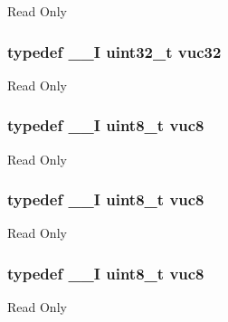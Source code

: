 Read Only \hypertarget{group___exported__types_ga2e08e321a35a55e72c5b3a507e76371f}{
\subsubsection[{vuc32}]{\setlength{\rightskip}{0pt plus 5cm}typedef {\bf \-\_\-\-\_\-\-I} uint32\-\_\-t {\bf vuc32}}}\label{group___exported__types_ga2e08e321a35a55e72c5b3a507e76371f}
Read Only \hypertarget{group___exported__types_gab0ec90ac9b2c5864755998c8d37c264a}{
\subsubsection[{vuc8}]{\setlength{\rightskip}{0pt plus 5cm}typedef {\bf \-\_\-\-\_\-\-I} uint8\-\_\-t {\bf vuc8}}}\label{group___exported__types_gab0ec90ac9b2c5864755998c8d37c264a}
Read Only \hypertarget{group___exported__types_gab0ec90ac9b2c5864755998c8d37c264a}{
\subsubsection[{vuc8}]{\setlength{\rightskip}{0pt plus 5cm}typedef {\bf \-\_\-\-\_\-\-I} uint8\-\_\-t {\bf vuc8}}}\label{group___exported__types_gab0ec90ac9b2c5864755998c8d37c264a}
Read Only \hypertarget{group___exported__types_gab0ec90ac9b2c5864755998c8d37c264a}{
\subsubsection[{vuc8}]{\setlength{\rightskip}{0pt plus 5cm}typedef {\bf \-\_\-\-\_\-\-I} uint8\-\_\-t {\bf vuc8}}}\label{group___exported__types_gab0ec90ac9b2c5864755998c8d37c264a}
Read Only 